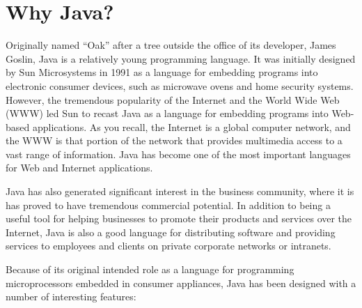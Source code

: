 \vspace*{-10pt}
\section{Why Java?}
\label{why-java}
\noindent Originally named ``Oak'' after a tree outside the office of its
developer, James Goslin, Java is a relatively young programming
language.  It was initially designed by Sun Microsystems in 1991 as a
language for embedding programs into electronic consumer devices, such
as microwave ovens and home security systems.  However, the tremendous
popularity of the Internet and the World Wide Web (WWW)
led Sun to recast Java as a language for embedding programs into
Web-based applications.  As you recall, the Internet is a
global computer network, and the WWW is that portion of the network
that provides multimedia access to a vast range of information.  Java
has become one of the most important languages for Web and Internet
applications.

Java has also generated significant interest in the business
community, where it is has proved to have tremendous commercial
potential.  In addition to being a useful tool for helping businesses
to promote their products and services over the Internet, Java is also a
good language for distributing software and providing services to
employees and clients on private corporate networks or intranets.

Because of its original intended role as a language for programming
microprocessors embedded in consumer appliances, Java has been
designed with a number of interesting features:


